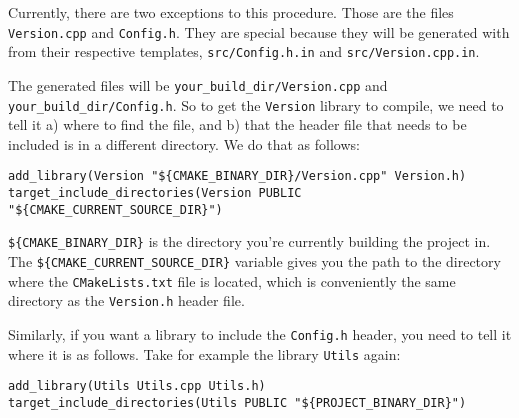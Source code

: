 Currently, there are two exceptions to this procedure. Those are the files
\verb|Version.cpp| and \verb|Config.h|. They are special because they will be
generated with \cmake from their respective templates, \verb|src/Config.h.in|
and \verb|src/Version.cpp.in|.

The generated files will be \verb|your_build_dir/Version.cpp| and
\verb|your_build_dir/Config.h|.  So to get the \verb|Version| library to
compile, we need to tell it a) where to find the file, and b) that the header
file that needs to be included is in a different directory. We do that as
follows:


\begin{lstlisting}
add_library(Version "${CMAKE_BINARY_DIR}/Version.cpp" Version.h)
target_include_directories(Version PUBLIC "${CMAKE_CURRENT_SOURCE_DIR}")
\end{lstlisting}

\verb|${CMAKE_BINARY_DIR}| is the directory you're currently building the
project in. The \verb|${CMAKE_CURRENT_SOURCE_DIR}| variable gives you the path
to the directory where the \verb|CMakeLists.txt| file is located, which is
conveniently the same directory as the \verb|Version.h| header file.



Similarly, if you want a library to include the \verb|Config.h| header, you
need to tell it where it is as follows. Take for example the library
\verb|Utils| again:

\begin{lstlisting}
add_library(Utils Utils.cpp Utils.h)
target_include_directories(Utils PUBLIC "${PROJECT_BINARY_DIR}")
\end{lstlisting}




